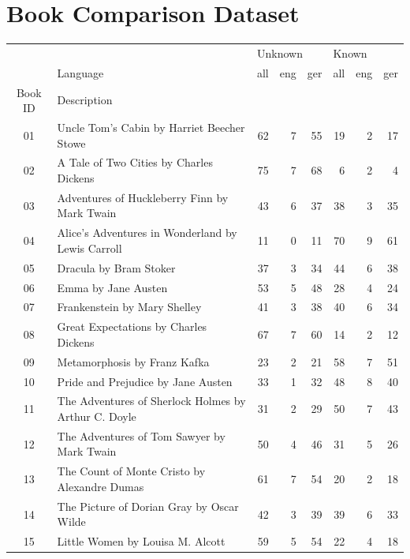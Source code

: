 \documentclass[11pt]{article}
\begin{document}
\section{Book Comparison Dataset}
\label{appendix:boco}
\begin{table}[ht!]
	\centering
	\begin{tabular}{clrrrrrr}
		\toprule
		& {} & \multicolumn{3}{l}{Unknown} & \multicolumn{3}{l}{Known} \\
		& Language &     all & eng & ger &   all & eng & ger \\
		Book ID & Description &         &     &     &       &     &     \\
		\midrule
		01 & Uncle Tom's Cabin by Harriet Beecher Stowe &      62 &   7 &  55 &    19 &   2 &  17 \\
		02 & A Tale of Two Cities by Charles Dickens &      75 &   7 &  68 &     6 &   2 &   4 \\
		03 & Adventures of Huckleberry Finn by Mark Twain &      43 &   6 &  37 &    38 &   3 &  35 \\
		04 & Alice’s Adventures in Wonderland by Lewis Carroll &      11 &   0 &  11 &    70 &   9 &  61 \\
		05 & Dracula by Bram Stoker &      37 &   3 &  34 &    44 &   6 &  38 \\
		06 & Emma by Jane Austen &      53 &   5 &  48 &    28 &   4 &  24 \\
		07 & Frankenstein by Mary Shelley &      41 &   3 &  38 &    40 &   6 &  34 \\
		08 & Great Expectations by Charles Dickens &      67 &   7 &  60 &    14 &   2 &  12 \\
		09 & Metamorphosis by Franz Kafka &      23 &   2 &  21 &    58 &   7 &  51 \\
		10 & Pride and Prejudice by Jane Austen &      33 &   1 &  32 &    48 &   8 &  40 \\
		11 & The Adventures of Sherlock Holmes by Arthur C. Doyle &      31 &   2 &  29 &    50 &   7 &  43 \\
		12 & The Adventures of Tom Sawyer by Mark Twain &      50 &   4 &  46 &    31 &   5 &  26 \\
		13 & The Count of Monte Cristo by Alexandre Dumas &      61 &   7 &  54 &    20 &   2 &  18 \\
		14 & The Picture of Dorian Gray by Oscar Wilde &      42 &   3 &  39 &    39 &   6 &  33 \\
		15 & Little Women by Louisa M. Alcott &      59 &   5 &  54 &    22 &   4 &  18 \\

\end{tabular}
\end{table}
\end{document}
